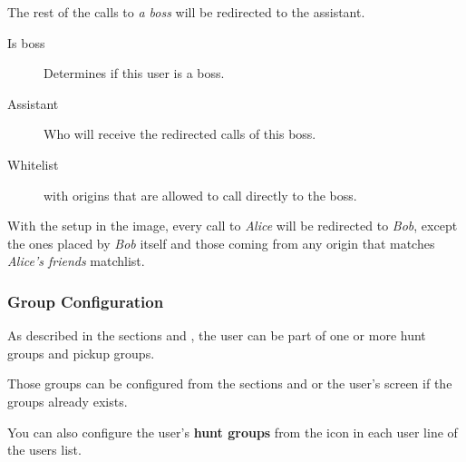 \documentclass[letterpaper,10pt,english]{sphinxmanual}
\begin{document}
The rest of the calls to \emph{a boss} will be redirected to the assistant.
\begin{description}
\item[{Is boss}] \leavevmode{}\label{administration_portal/client/vpbx/users:term-is-boss}
Determines if this user is a boss.

\item[{Assistant}] \leavevmode{}\label{administration_portal/client/vpbx/users:term-assistant}
Who will receive the redirected calls of this boss.

\item[{Whitelist}] \leavevmode{}\label{administration_portal/client/vpbx/users:term-whitelist}
{\hyperref[administration_portal/client/vpbx/routing_tools/match_lists:match\string-lists]{}} with origins that are allowed to call directly to
the boss.

\end{description}

With the setup in the image, every call to \emph{Alice} will be redirected to \emph{Bob},
except the ones placed by \emph{Bob} itself and those coming from any origin that matches
\emph{Alice's friends} matchlist.


\subsubsection{Group Configuration}
\label{administration_portal/client/vpbx/users:group-configuration}
As described in the sections {\hyperref[administration_portal/client/vpbx/routing_endpoints/hunt_groups:huntgroups]{}} and {\hyperref[administration_portal/client/vpbx/user_configuration/pick_up_groups:capture\string-groups]{}}, the
user can be part of one or more hunt groups and pickup groups.

Those groups can be configured from the sections {\hyperref[administration_portal/client/vpbx/routing_endpoints/hunt_groups:huntgroups]{}} and
{\hyperref[administration_portal/client/vpbx/user_configuration/pick_up_groups:capture\string-groups]{}} or the user's screen if the groups already exists.

You can also configure the user's \textbf{hunt groups} from the icon in each user
line of the users list.
\end{document}
